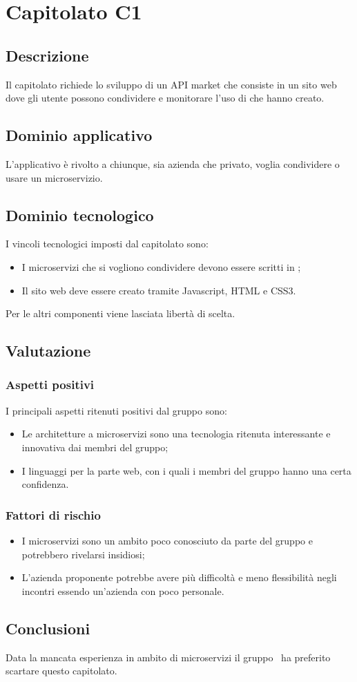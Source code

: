 \documentclass[../StudioDiFattibilita.tex]{subfiles}
\begin{document}
	\section{Capitolato C1}
		\subsection{Descrizione}
		Il capitolato richiede lo sviluppo di un API market che consiste in un sito web dove gli utente possono condividere e monitorare l'uso di  che hanno creato.
		\subsection{Dominio applicativo}
		L'applicativo è rivolto a chiunque, sia azienda che privato, voglia condividere o usare un microservizio.
		\subsection{Dominio tecnologico} 
		I vincoli tecnologici imposti dal capitolato sono:
		\begin{itemize}
			\item I microservizi che si vogliono condividere devono essere scritti in ;
			\item Il sito web deve essere creato tramite Javascript, HTML e CSS3.
		\end{itemize}
		Per le altri componenti viene lasciata libertà di scelta.
		\subsection{Valutazione}
			\subsubsection{Aspetti positivi}
			I principali aspetti ritenuti positivi dal gruppo sono:
				\begin{itemize}
				\item Le architetture a microservizi sono una tecnologia ritenuta interessante e innovativa dai membri del gruppo; 
				\item I linguaggi per la parte web, con i quali i membri del gruppo hanno una certa confidenza.
			\end{itemize}
			\subsubsection{Fattori di rischio}
				\begin{itemize}
				\item I microservizi sono un ambito poco conosciuto da parte del gruppo e potrebbero rivelarsi insidiosi;
				\item L'azienda proponente potrebbe avere più difficoltà e meno flessibilità negli incontri essendo un'azienda con poco personale.
			\end{itemize}
			\subsection{Conclusioni}
			Data la mancata esperienza in ambito di microservizi il gruppo \kaleidoscode\ ha preferito scartare questo capitolato.
\end{document}
